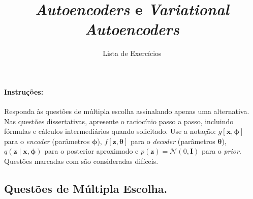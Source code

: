 \documentclass{dlproblemset}
\title{\textit{Autoencoders} e \textit{Variational Autoencoders}}
\subtitle{Lista de Exercícios}
\newcommand{\thetav}{\boldsymbol{\theta}}
\begin{document}
\paragraph{Instruções:} Responda às questões de múltipla escolha assinalando apenas uma alternativa. Nas questões dissertativas, apresente o raciocínio passo a passo, incluindo fórmulas e cálculos intermediários quando solicitado. Use a notação: $g[\mathbf{x}, \boldsymbol{\phi}]$ para o \textit{encoder} (parâmetros $\boldsymbol{\phi}$), $f[\mathbf{z}, \thetav]$ para o \textit{decoder} (parâmetros $\thetav$), $q(\mathbf{z} \mid \mathbf{x}, \boldsymbol{\phi})$ para o posterior aproximado e $p(\mathbf{z}) = \mathcal{N}(0, \mathbf{I})$ para o \textit{prior}. Questões marcadas com  são consideradas difíceis.

\subsection*{Questões de Múltipla Escolha.}
\end{document}
